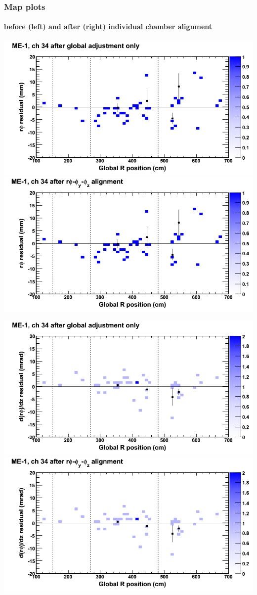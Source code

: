 \documentclass[compress]{beamer}
\begin{document}
\begin{frame}
\frametitle{Map plots}
\framesubtitle{before (left) and after (right) individual chamber alignment}
\includegraphics[width=0.5\linewidth]{ringmapplots_3dof/before_CSCvsr_mem1ch34_x.png} \includegraphics[width=0.5\linewidth]{ringmapplots_3dof/after_CSCvsr_mem1ch34_x.png}

\includegraphics[width=0.5\linewidth]{ringmapplots_3dof/before_CSCvsr_mem1ch34_dxdz.png} \includegraphics[width=0.5\linewidth]{ringmapplots_3dof/after_CSCvsr_mem1ch34_dxdz.png}
\end{frame}
\end{document}
